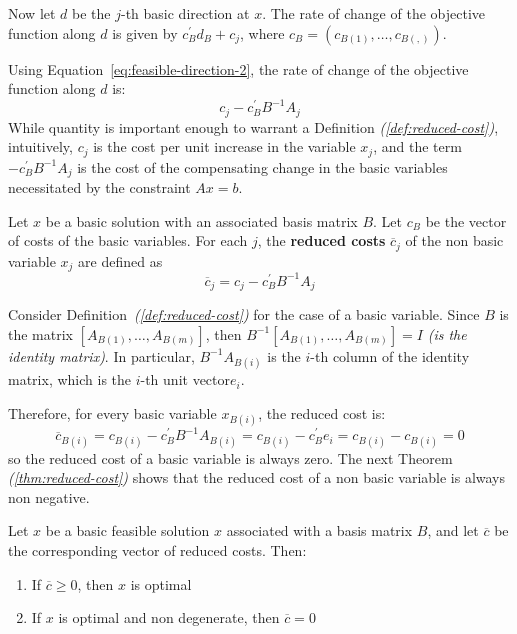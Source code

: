 \documentclass[english]{article}
\begin{document}
\bigskip
Now let \(d\) be the \(j\)-th basic direction at \(x\).
The rate of change of the objective function along \(d\) is given by \(c^\prime_B d_B + c_j\), where \(c_B = \left( c_{B(1)}, \ldots, c_{B(,)} \right)\).

Using Equation~\ref{eq:feasible-direction-2}, the rate of change of the objective function along \(d\) is:
\[ c_j - c^\prime_B B^{-1} A_j \]
While quantity is important enough to warrant a Definition \textit{(\ref{def:reduced-cost})},
intuitively, \(c_j\) is the cost per unit increase in the variable \(x_j\), and the term \(-c^\prime_B B^{-1} A_j\) is the cost of the compensating change in the basic variables necessitated by the constraint \(Ax = b\).

\begin{definition}
  Let \(x\) be a basic solution with an associated basis matrix \(B\).
  Let \(c_B\) be the vector of costs of the basic variables.
  For each \(j\), the \textbf{reduced costs} \(\overline{c}_j\) of the non basic variable \(x_j\) are defined as
  \[ \overline{c}_j = c_j - c^\prime_B B^{-1} A_j \]
  \label{def:reduced-cost}
\end{definition}

\bigskip
Consider Definition~\textit{(\ref{def:reduced-cost})} for the case of a basic variable.
Since \(B\) is the matrix \(\left[ A_{B(1)}, \ldots, A_{B(m)} \right]\), then \(B^{-1}[A_{B(1)}, \ldots, A_{B(m)}] = I\) \textit{(is the identity matrix)}.
In particular, \(B^{-1} A_{B(i)}\) is the \(i\)-th column of the identity matrix, which is the \(i\)-th unit vector\(e_i\).

Therefore, for every basic variable \(x_{B(i)}\), the reduced cost is:
\[ \overline{c}_{B(i)} = c_{B(i)} - c^\prime_B B^{-1} A_{B(i)} = c_{B(i)} - c^\prime_B e_i = c_{B(i)} -  c_{B(i)} = 0 \]
so the reduced cost of a basic variable is always zero.
The next Theorem \textit{(\ref{thm:reduced-cost})} shows that the reduced cost of a non basic variable is always non negative.

\begin{theorem}
  Let \(x\) be a basic feasible solution \(x\) associated with a basis matrix \(B\), and let \(\overline{c}\) be the corresponding vector of reduced costs.
  Then:

  \begin{enumerate}
    \item If \(\overline{c} \geq 0\), then \(x\) is optimal
    \item If \(x\) is optimal and non degenerate, then \(\overline{c} = 0\)
  \end{enumerate}
  \label{thm:reduced-cost}
\end{theorem}
\end{document}
